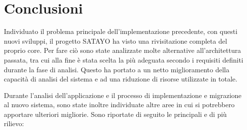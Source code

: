 \chapter{Conclusioni}
\label{cha:conclusioni}

Individuato il problema principale dell'implementazione precedente, con questi nuovi
sviluppi, il progetto SATAYO ha visto una rivisitazione completa del proprio
core. Per fare ciò sono state analizzate molte alternative all'architettura passata,
tra cui alla fine è stata scelta la più adeguata secondo i requisiti definiti
durante la fase di analisi. Questo ha portato a un netto miglioramento della capacità
di analisi del sistema e ad una riduzione di risorse utilizzate in totale.

Durante l'analisi dell'applicazione e il processo di implementazione e migrazione
al nuovo sistema, sono state inoltre individuate altre aree in cui si potrebbero
apportare ulteriori migliorie. Sono riportate di seguito le principali e di più rilievo:

